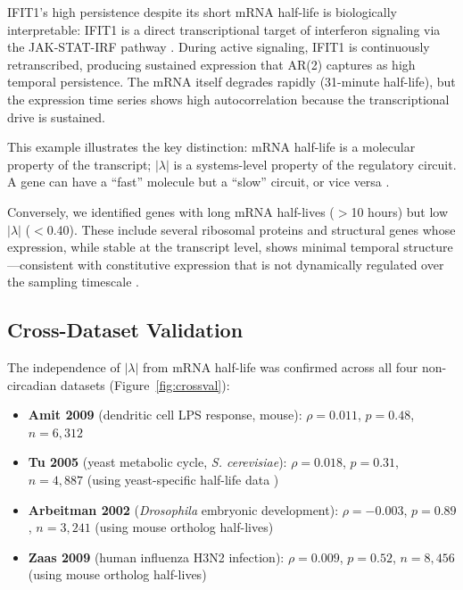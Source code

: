 \documentclass[11pt,letterpaper]{article}
\begin{document}
IFIT1's high persistence despite its short mRNA half-life is biologically interpretable: IFIT1 is a direct transcriptional target of interferon signaling via the JAK-STAT-IRF pathway \citep{schoggins2011diverse, schneider2014interferon}. During active signaling, IFIT1 is continuously retranscribed, producing sustained expression that AR(2) captures as high temporal persistence. The mRNA itself degrades rapidly (31-minute half-life), but the expression time series shows high autocorrelation because the transcriptional drive is sustained.

This example illustrates the key distinction: mRNA half-life is a molecular property of the transcript; $|\lambda|$ is a systems-level property of the regulatory circuit. A gene can have a ``fast'' molecule but a ``slow'' circuit, or vice versa \citep{alon2007network}.

Conversely, we identified genes with long mRNA half-lives ($>$10 hours) but low $|\lambda|$ ($<$0.40). These include several ribosomal proteins and structural genes whose expression, while stable at the transcript level, shows minimal temporal structure---consistent with constitutive expression that is not dynamically regulated over the sampling timescale \citep{schwanhausser2011global}.

\subsection{Cross-Dataset Validation}

The independence of $|\lambda|$ from mRNA half-life was confirmed across all four non-circadian datasets (Figure~\ref{fig:crossval}):

\begin{itemize}
\item \textbf{Amit 2009} (dendritic cell LPS response, mouse): $\rho = 0.011$, $p = 0.48$, $n = 6{,}312$
\item \textbf{Tu 2005} (yeast metabolic cycle, \textit{S. cerevisiae}): $\rho = 0.018$, $p = 0.31$, $n = 4{,}887$ (using yeast-specific half-life data \citep{wang2002precision})
\item \textbf{Arbeitman 2002} (\textit{Drosophila} embryonic development): $\rho = -0.003$, $p = 0.89$, $n = 3{,}241$ (using mouse ortholog half-lives)
\item \textbf{Zaas 2009} (human influenza H3N2 infection): $\rho = 0.009$, $p = 0.52$, $n = 8{,}456$ (using mouse ortholog half-lives)
\end{itemize}
\end{document}
